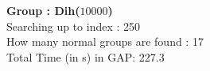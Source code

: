 \textbf{Group : Dih($10000$)}\\
Searching up to index : 250\\
How many normal groups are found : 17\\
Total Time (in s) in GAP: 227.3\\

